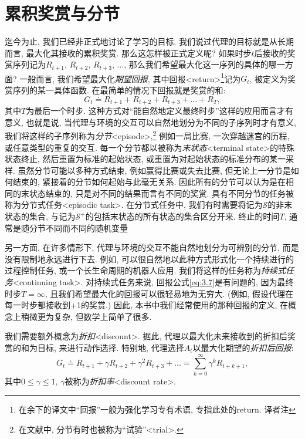 \section{累积奖赏与分节}\label{sec:3.3}

迄今为止, 我们已经非正式地讨论了学习的目标. 我们说过代理的目标就是从长期而言, 最大化其接收的累积奖赏. 那么这怎样被正式定义呢? 如果时步$t$后接收的奖赏序列记为$R_{t + 1}$, $R_{t + 2}$, $R_{t + 3}$, $\dots$, 那么我们希望最大化这一序列的具体的哪一方面? 一般而言, 我们希望最大化\emph{期望回报}, 其中回报<return>\footnote{在余下的译文中``回报''一般为强化学习专有术语, 专指此处的return. 译者注}记为$G_t$, 被定义为奖赏序列的某一具体函数. 在最简单的情况下回报就是奖赏的和:
\begin{equation}\label{eq:3.7}
G_t \doteq R_{t + 1} + R_{t + 2} + R_{t + 3} + \dots + R_T,
\end{equation}
其中$T$为最后一个时步. 这种方式对``能自然地定义最终时步''这样的应用而言才有意义, 也就是说, 当代理与环境的交互可以自然地划分为不同的子序列时才有意义, 我们将这样的子序列称为\emph{分节}<episode>,\footnote{在文献中, 分节有时也被称为``试验''<trial>.} 例如一局比赛, 一次穿越迷宫的历程, 或任意类型的重复的交互. 每一个分节都以被称为\emph{末状态}<terminal state>的特殊状态终止, 然后重置为标准的起始状态, 或重置为对起始状态的标准分布的某一采样. 虽然分节可能以多种方式结束, 例如赢得比赛或失去比赛, 但无论上一分节是如何结束的, 紧接着的分节如何起始与此毫无关系. 因此所有的分节可以认为是在相同的末状态结束的, 只是对不同的结果而言有不同的奖赏. 具有不同分节的任务被称为分节式任务<episodic task>. 在分节式任务中, 我们有时需要将记为$\mathcal{S}$的非末状态的集合, 与记为$\mathcal{S}^+$的包括末状态的所有状态的集合区分开来. 终止的时间$T$, 通常是随分节不同而不同的随机变量

另一方面, 在许多情形下, 代理与环境的交互不能自然地划分为可辨别的分节, 而是没有限制地永远进行下去. 例如, 可以很自然地以此种方式形式化一个持续进行的过程控制任务, 或一个长生命周期的机器人应用. 我们将这样的任务称为\emph{持续式任务}<continuing task>. 对持续式任务来说, 回报公式\eqref{eq:3.7}是有问题的, 因为最终时步$T = \infty$, 且我们希望最大化的回报可以很轻易地为无穷大. (例如, 假设代理在每一时步都接收到+1的奖赏.) 因此, 本书中我们经常使用的那种回报的定义, 在概念上稍微更为复杂, 但数学上简单了很多. 

我们需要额外概念为\emph{折扣}<discount>. 据此, 代理以最大化未来接收到的折扣后奖赏的和为目标, 来进行动作选择. 特别地, 代理选择$A_t$以最大化期望的\emph{折扣后回报}:
\begin{equation}\label{eq:3.8}
G_t \doteq R_{t + 1} + \gamma R_{t + 2} + \gamma^2 R_{t + 3} + \dots = \sum_{k = 0}^{\infty} \gamma^k R_{t + k + 1},
\end{equation}
其中$0 \leq \gamma \leq 1$, $\gamma$被称为\emph{折扣率}<discount rate>.

